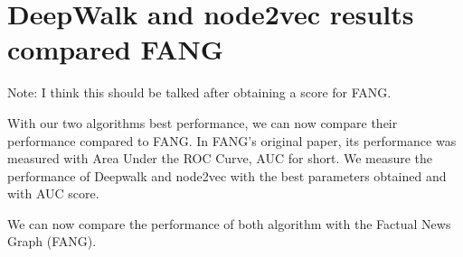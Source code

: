 \section{DeepWalk and node2vec results compared FANG}
Note: I think this should be talked after obtaining a score for FANG.

With our two algorithms best performance, we can now compare their performance compared to FANG.
In FANG's original paper, its performance was measured with Area Under the ROC Curve, AUC for short.
We measure the performance of Deepwalk and node2vec with the best parameters obtained and with AUC score.

We can now compare the performance of both algorithm with the Factual News Graph (FANG).
